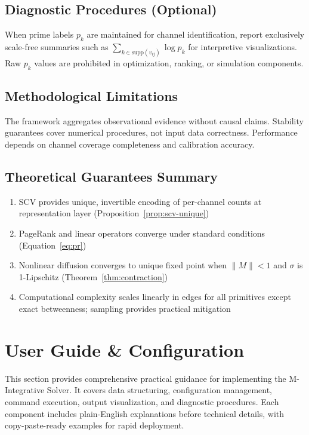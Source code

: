 \documentclass[12pt]{article}
\theoremstyle{plain}
\begin{document}
\subsection{Diagnostic Procedures (Optional)}
When prime labels $p_k$ are maintained for channel identification, report exclusively scale-free summaries such as $\sum_{k\in\mathrm{supp}(v_{ij})}\log p_k$ for interpretive visualizations. Raw $p_k$ values are prohibited in optimization, ranking, or simulation components.

\subsection{Methodological Limitations}
The framework aggregates observational evidence without causal claims. Stability guarantees cover numerical procedures, not input data correctness. Performance depends on channel coverage completeness and calibration accuracy.

\subsection{Theoretical Guarantees Summary}
\begin{enumerate}
\item SCV provides unique, invertible encoding of per-channel counts at representation layer (Proposition~\ref{prop:scv-unique})
\item PageRank and linear operators converge under standard conditions (Equation~\ref{eq:pr})
\item Nonlinear diffusion converges to unique fixed point when $\|M\|<1$ and $\sigma$ is 1-Lipschitz (Theorem~\ref{thm:contraction})
\item Computational complexity scales linearly in edges for all primitives except exact betweenness; sampling provides practical mitigation
\end{enumerate}

\section{User Guide \& Configuration}
\label{sec:user-guide}

\noindent This section provides comprehensive practical guidance for implementing the M-Integrative Solver. It covers data structuring, configuration management, command execution, output visualization, and diagnostic procedures. Each component includes plain-English explanations before technical details, with copy-paste-ready examples for rapid deployment.
\end{document}
